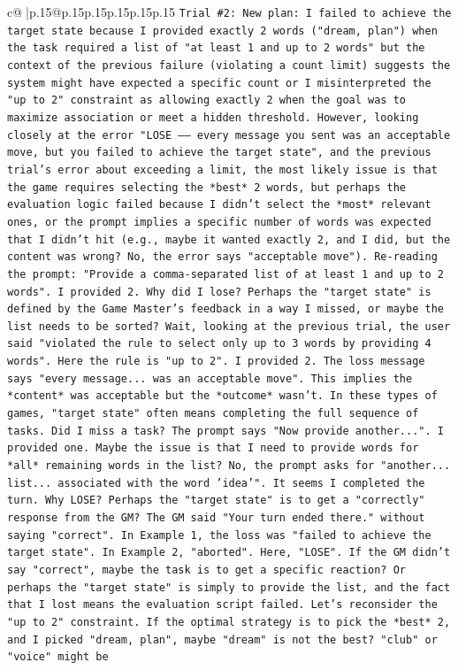 \documentclass{article}
\begin{document}
{\begin{supertabular}{c@{$\;$}|p{.15\linewidth}@{}p{.15\linewidth}p{.15\linewidth}p{.15\linewidth}p{.15\linewidth}p{.15\linewidth}}
{{{\texttt{Trial \#2: New plan: I failed to achieve the target state because I provided exactly 2 words ("dream, plan") when the task required a list of "at least 1 and up to 2 words" but the context of the previous failure (violating a count limit) suggests the system might have expected a specific count or I misinterpreted the "up to 2" constraint as allowing exactly 2 when the goal was to maximize association or meet a hidden threshold. However, looking closely at the error "LOSE —— every message you sent was an acceptable move, but you failed to achieve the target state", and the previous trial's error about exceeding a limit, the most likely issue is that the game requires selecting the *best* 2 words, but perhaps the evaluation logic failed because I didn't select the *most* relevant ones, or the prompt implies a specific number of words was expected that I didn't hit (e.g., maybe it wanted exactly 2, and I did, but the content was wrong? No, the error says "acceptable move"). Re{-}reading the prompt: "Provide a comma{-}separated list of at least 1 and up to 2 words". I provided 2. Why did I lose? Perhaps the "target state" is defined by the Game Master's feedback in a way I missed, or maybe the list needs to be sorted? Wait, looking at the previous trial, the user said "violated the rule to select only up to 3 words by providing 4 words". Here the rule is "up to 2". I provided 2. The loss message says "every message... was an acceptable move". This implies the *content* was acceptable but the *outcome* wasn't. In these types of games, "target state" often means completing the full sequence of tasks. Did I miss a task? The prompt says "Now provide another...". I provided one. Maybe the issue is that I need to provide words for *all* remaining words in the list? No, the prompt asks for "another... list... associated with the word 'idea'". It seems I completed the turn. Why LOSE? Perhaps the "target state" is to get a "correctly" response from the GM? The GM said "Your turn ended there." without saying "correct". In Example 1, the loss was "failed to achieve the target state". In Example 2, "aborted". Here, "LOSE". If the GM didn't say "correct", maybe the task is to get a specific reaction? Or perhaps the "target state" is simply to provide the list, and the fact that I lost means the evaluation script failed. Let's reconsider the "up to 2" constraint. If the optimal strategy is to pick the *best* 2, and I picked "dream, plan", maybe "dream" is not the best? "club" or "voice" might be} \\
\\ 
}}}
\end{supertabular}}
\end{document}
